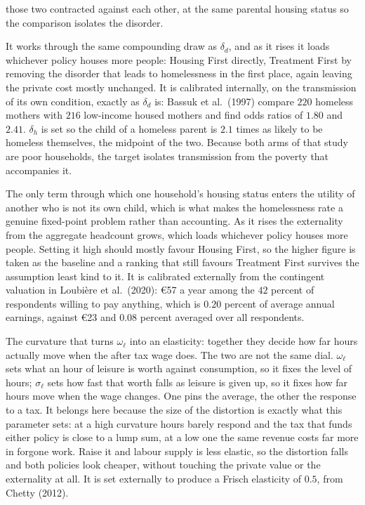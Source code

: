 \documentclass[10pt]{article}
\begin{document}
\begin{description}
those two contracted against each other, at the same parental housing status so
the comparison isolates the disorder.
\item[$\delta_h$, what the child loses to homelessness.] It works through the same
compounding draw as $\delta_d$, and as it rises it loads whichever policy houses
more people: Housing First directly, Treatment First by removing the disorder that
leads to homelessness in the first place, again leaving
the private cost mostly unchanged. It is calibrated internally, on the
transmission of its own condition, exactly as $\delta_d$ is: Bassuk et al.\ (1997)
compare $220$ homeless mothers with $216$ low-income housed mothers and find odds ratios of $1.80$ and $2.41$. $\delta_h$
is set so the child of a homeless parent is $2.1$ times as likely to be homeless
themselves, the midpoint of the two. Because both arms of that study are poor households, the target
isolates transmission from the poverty that accompanies it.
\item[$\kappa_x$, the disamenity of homelessness.]\label{sec:fleftout} The only term through which one
household's housing status enters the utility of another who is not its own child,
which is what makes the homelessness rate a genuine fixed-point problem rather than
accounting. As it rises the externality from the aggregate headcount
grows, which loads whichever policy houses more people. Setting it high should
mostly favour Housing First, so the higher figure is taken as the baseline and a ranking
that still favours Treatment First survives the assumption least kind to it. It is
calibrated externally from the contingent valuation in Loubi\`ere et al.\ (2020):
\euro{}57 a year among the $42$ percent of respondents willing to pay anything,
which is $0.20$ percent of average annual earnings, against \euro{}23 and $0.08$
percent averaged over all respondents.
\item[$\sigma_{\ell}$, the curvature on leisure.]
The curvature that turns $\omega_{\ell}$ into an elasticity: together
they decide how far hours actually move when the after tax wage does. The two are
not the same dial. $\omega_{\ell}$ sets what an hour of leisure is worth against
consumption, so it fixes the level of hours; $\sigma_{\ell}$ sets how fast that
worth falls as leisure is given up, so it fixes how far hours move when the wage
changes. One pins the average, the other the response to a tax. It belongs
here because the size of the
distortion is exactly what this parameter sets: at a high curvature hours barely
respond and the tax that funds either policy is close to a lump sum, at a low one
the same revenue costs far more in forgone work. Raise it and labour supply is less
elastic, so the distortion falls and both policies look cheaper, without touching
the private value or the externality at all. It is set externally to produce a
Frisch elasticity of $0.5$, from Chetty (2012).
\end{description}
\end{document}
